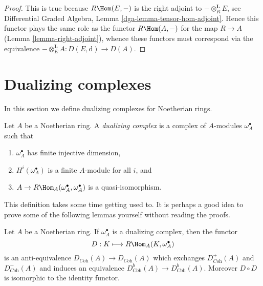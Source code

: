 \begin{proof}
This is true because $R\Hom(E, -)$ is the right adjoint
to $- \otimes^\mathbf{L}_R E$, see
Differential Graded Algebra, Lemma \ref{dga-lemma-tensor-hom-adjoint}.
Hence this functor plays the same role as the functor
$R\Hom(A, -)$ for the map $R \to A$ (Lemma \ref{lemma-right-adjoint}),
whence these functors must correspond via the equivalence
$- \otimes^\mathbf{L}_E A : D(E, \text{d}) \to D(A)$.
\end{proof}




\section{Dualizing complexes}
\label{section-dualizing}

\noindent
In this section we define dualizing complexes for Noetherian rings.

\begin{definition}
\label{definition-dualizing}
Let $A$ be a Noetherian ring. A {\it dualizing complex} is a
complex of $A$-modules $\omega_A^\bullet$ such that
\begin{enumerate}
\item $\omega_A^\bullet$ has finite injective dimension,
\item $H^i(\omega_A^\bullet)$ is a finite $A$-module for all $i$, and
\item $A \to R\Hom_A(\omega_A^\bullet, \omega_A^\bullet)$
is a quasi-isomorphism.
\end{enumerate}
\end{definition}

\noindent
This definition takes some time getting used to. It is perhaps a good
idea to prove some of the following lemmas yourself without reading
the proofs.

\begin{lemma}
\label{lemma-dualizing}
Let $A$ be a Noetherian ring. If $\omega_A^\bullet$ is a dualizing
complex, then the functor
$$
D : K \longmapsto R\Hom_A(K, \omega_A^\bullet)
$$
is an anti-equivalence $D_{\textit{Coh}}(A) \to D_{\textit{Coh}}(A)$
which exchanges $D^+_{\textit{Coh}}(A)$ and $D^-_{\textit{Coh}}(A)$
and induces an equivalence $D^b_{\textit{Coh}}(A) \to D^b_{\textit{Coh}}(A)$.
Moreover $D \circ D$ is isomorphic to the identity functor.
\end{lemma}


